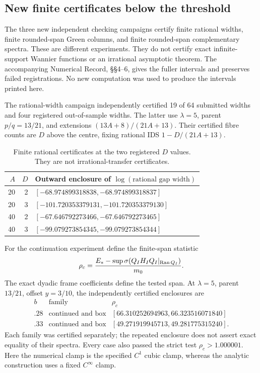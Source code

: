 \subsection{New finite certificates below the threshold}\label{sec:below-numerics}
The three new independent checking campaigns certify finite rational widths, finite rounded-span Green columns, and finite rounded-span complementary spectra. These are different experiments. They do not certify exact infinite-support Wannier functions or an irrational asymptotic theorem. The accompanying Numerical Record, \S\S4--6, gives the fuller intervals and preserves failed registrations. No new computation was used to produce the intervals printed here.

The rational-width campaign independently certified 19 of 64 submitted widths and four registered out-of-sample widths. The latter use $\lambda=5$, parent $p/q=13/21$, and extensions
$(13A+8)/(21A+13)$. Their certified fibre counts are $D$ above the centre, fixing rational IDS $1-D/(21A+13)$.
\begin{table}[ht]
\centering\small
\begin{tabular}{@{}rrl@{}}
\toprule
$A$&$D$&Outward enclosure of $\log(\text{rational gap width})$\\
\midrule
20&2&$[-68.974899318838,-68.974899318837]$\\
20&3&$[-101.720353379131,-101.720353379130]$\\
40&2&$[-67.646792273466,-67.646792273465]$\\
40&3&$[-99.079273854345,-99.079273854344]$\\
\bottomrule
\end{tabular}
\caption{Finite rational certificates at the two registered $D$ values. They are not irrational-transfer certificates.}\label{tab:belowwidthchecks}
\end{table}

For the continuation experiment define the finite-span statistic
\[
 \rho_c=\frac{E_*-\sup\sigma(Q_IH_IQ_I|_{\operatorname{Ran} Q_I})}{m_0}.
\]
The exact dyadic frame coefficients define the tested span.
At $\lambda=5$, parent $13/21$, offset $y=3/10$, the independently certified enclosures are
\[
\begin{array}{ccl}
 b&\text{family}&\rho_c\\
 .28&\text{continued and box}&[66.310252694963,66.323516071840]\\
 .33&\text{continued and box}&[49.271919945713,49.281775315240].
\end{array}
\]
Each family was certified separately; the repeated enclosure does not assert exact equality of their spectra. Every case also passed the strict test $\rho_c>1.000001$. Here the numerical clamp is the specified $C^1$ cubic clamp, whereas the analytic construction uses a fixed $C^\infty$ clamp.

